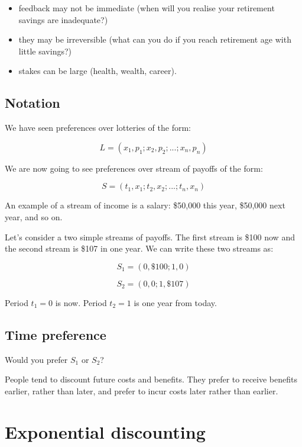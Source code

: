\documentclass[
  letterpaper,
  DIV=11,
  numbers=noendperiod]{scrreprt}
\providecommand{\tightlist}{%
  \setlength{\itemsep}{0pt}\setlength{\parskip}{0pt}}\usepackage{longtable,booktabs,array}
\begin{document}
\begin{itemize}
\tightlist
\item
  feedback may not be immediate (when will you realise your retirement
  savings are inadequate?)
\item
  they may be irreversible (what can you do if you reach retirement age
  with little savings?)
\item
  stakes can be large (health, wealth, career).
\end{itemize}

\hypertarget{notation-1}{%
\section*{Notation}\label{notation-1}}


We have seen preferences over lotteries of the form:

\[L=(x_1,p_1;x_2,p_2;...;x_n,p_n)\]

We are now going to see preferences over stream of payoffs of the form:

\[S=(t_1,x_1;t_2,x_2;...;t_n,x_n)\]

An example of a stream of income is a salary: \$50,000 this year,
\$50,000 next year, and so on.

Let's consider a two simple streams of payoffs. The first stream is
\$100 now and the second stream is \$107 in one year. We can write these
two streams as:

\[S_1=(0,\$100;1,0)\]

\[S_2=(0,0;1,\$107)\]

Period \(t_1=0\) is now. Period \(t_2=1\) is one year from today.

\hypertarget{time-preference}{%
\section*{Time preference}\label{time-preference}}


Would you prefer \(S_1\) or \(S_2\)?

People tend to discount future costs and benefits. They prefer to
receive benefits earlier, rather than later, and prefer to incur costs
later rather than earlier.

\hypertarget{exponential-discounting}{%
\chapter{Exponential discounting}\label{exponential-discounting}}
\end{document}
